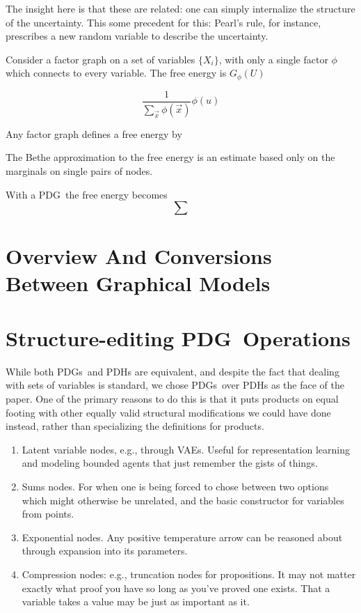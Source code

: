 \documentclass{article}
\newcommand{\MN}{PDG}
\newcommand{\MNH}{PDH}
\newcommand{\MNs}{\MN s}
\begin{document}
	The insight here is that these are related: one can simply internalize the structure of the uncertainty. This some precedent for this: Pearl's rule, for instance, prescribes a new random variable to describe the uncertainty.	
	
	Consider a factor graph on a set of variables $\{ X_i \}$, with only a single factor $\phi$ which connects to every variable. The free energy is $G_\phi(U)$
	
	\[ \frac{1}{\sum_{\vec x} \phi(\vec x)} \phi(u) \]
	
	
	Any factor graph defines a free energy by 
	
	The Bethe approximation to the free energy is an estimate based only on the marginals on single pairs of nodes.
		
	With a \MN\, the free energy becomes
	\[ \sum \]
	
	\section{Overview And Conversions Between Graphical Models}
	\label{sec:many-relations-graphical-models}
	
	
	
	\section{Structure-editing \MN\ Operations}
	
	While both \MNs\ and \MNH s are equivalent, and despite the fact that dealing with sets of variables is standard, we chose \MNs\ over \MNH s as the face of the paper. One of the primary reasons to do this is that it puts products on equal footing with other equally valid structural modifications we could have done instead, rather than specializing the definitions for products.
	
	\begin{enumerate}
		\item Latent variable nodes, e.g., through VAEs. Useful for representation learning and modeling bounded agents that just remember the gists of things.
		
		\item Sums nodes. For when one is being forced to chose between two options which might otherwise be unrelated, and the basic constructor for variables from points.
		
		\item Exponential nodes. Any positive temperature arrow can be reasoned about through expansion into its parameters.
		
		\item Compression nodes: e.g., truncation nodes for propositions. It may not matter exactly what proof you have so long as you've proved one exists. That a variable takes a value may be just as important as it.
	\end{enumerate}
	
\end{document}
